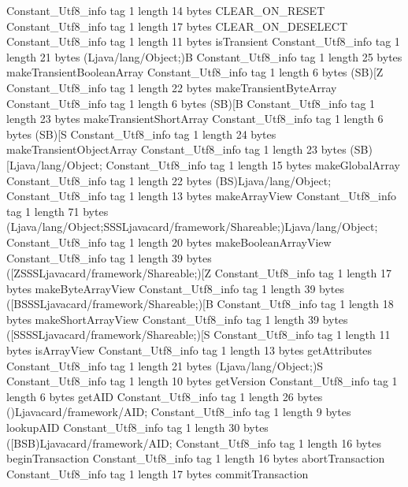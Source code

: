 {{		Constant_Utf8_info {
			tag	1
			length	14
			bytes	CLEAR_ON_RESET
		}
		Constant_Utf8_info {
			tag	1
			length	17
			bytes	CLEAR_ON_DESELECT
		}
		Constant_Utf8_info {
			tag	1
			length	11
			bytes	isTransient
		}
		Constant_Utf8_info {
			tag	1
			length	21
			bytes	(Ljava/lang/Object;)B
		}
		Constant_Utf8_info {
			tag	1
			length	25
			bytes	makeTransientBooleanArray
		}
		Constant_Utf8_info {
			tag	1
			length	6
			bytes	(SB)[Z
		}
		Constant_Utf8_info {
			tag	1
			length	22
			bytes	makeTransientByteArray
		}
		Constant_Utf8_info {
			tag	1
			length	6
			bytes	(SB)[B
		}
		Constant_Utf8_info {
			tag	1
			length	23
			bytes	makeTransientShortArray
		}
		Constant_Utf8_info {
			tag	1
			length	6
			bytes	(SB)[S
		}
		Constant_Utf8_info {
			tag	1
			length	24
			bytes	makeTransientObjectArray
		}
		Constant_Utf8_info {
			tag	1
			length	23
			bytes	(SB)[Ljava/lang/Object;
		}
		Constant_Utf8_info {
			tag	1
			length	15
			bytes	makeGlobalArray
		}
		Constant_Utf8_info {
			tag	1
			length	22
			bytes	(BS)Ljava/lang/Object;
		}
		Constant_Utf8_info {
			tag	1
			length	13
			bytes	makeArrayView
		}
		Constant_Utf8_info {
			tag	1
			length	71
			bytes	(Ljava/lang/Object;SSSLjavacard/framework/Shareable;)Ljava/lang/Object;
		}
		Constant_Utf8_info {
			tag	1
			length	20
			bytes	makeBooleanArrayView
		}
		Constant_Utf8_info {
			tag	1
			length	39
			bytes	([ZSSSLjavacard/framework/Shareable;)[Z
		}
		Constant_Utf8_info {
			tag	1
			length	17
			bytes	makeByteArrayView
		}
		Constant_Utf8_info {
			tag	1
			length	39
			bytes	([BSSSLjavacard/framework/Shareable;)[B
		}
		Constant_Utf8_info {
			tag	1
			length	18
			bytes	makeShortArrayView
		}
		Constant_Utf8_info {
			tag	1
			length	39
			bytes	([SSSSLjavacard/framework/Shareable;)[S
		}
		Constant_Utf8_info {
			tag	1
			length	11
			bytes	isArrayView
		}
		Constant_Utf8_info {
			tag	1
			length	13
			bytes	getAttributes
		}
		Constant_Utf8_info {
			tag	1
			length	21
			bytes	(Ljava/lang/Object;)S
		}
		Constant_Utf8_info {
			tag	1
			length	10
			bytes	getVersion
		}
		Constant_Utf8_info {
			tag	1
			length	6
			bytes	getAID
		}
		Constant_Utf8_info {
			tag	1
			length	26
			bytes	()Ljavacard/framework/AID;
		}
		Constant_Utf8_info {
			tag	1
			length	9
			bytes	lookupAID
		}
		Constant_Utf8_info {
			tag	1
			length	30
			bytes	([BSB)Ljavacard/framework/AID;
		}
		Constant_Utf8_info {
			tag	1
			length	16
			bytes	beginTransaction
		}
		Constant_Utf8_info {
			tag	1
			length	16
			bytes	abortTransaction
		}
		Constant_Utf8_info {
			tag	1
			length	17
			bytes	commitTransaction
}}}
